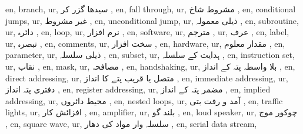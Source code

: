 en, branch,
ur,  سیدھا گزر کر  ,
en, fall through,
ur, مشروط شاخ  ,
en, conditional jumps,
ur, غیر مشروط  ,
en, unconditional jump,
ur, ذیلی معمولہ  ,
en, subroutine,
ur,  دائرہ  ,
en, loop,
ur, نرم افزار  ,
en, software,
ur,  مترجم  ,
ur, عرف  ,
en, label,
ur, تبصرہ  ,
en, comments,
ur,  سخت افزار  ,
en, hardware,
ur, مقدار معلوم  ,
en, parameter,
ur, ذیلی سلسلہ  ,
en, subset,
ur,  ہدایت کے سلسلہ  ,
en, instruction set,
ur, نقاب ,
en, mask,
ur,  مصافحہ  ,
en, handshaking,
ur,  بلا واسطہ پتہ کے انداز ,
en, direct addressing,
ur, متصل یا قریب پتے کا انداز ,
en, immediate addressing,
ur,  دفتری پتہ انداز ,
en, register addressing,
ur, مضمر پتہ کے انداز  ,
en, implied addressing,
ur,  محیط دائروں  ,
en, nested loops,
ur,  آمد و رفت بتی  ,
en, traffic lights,
ur,  افزائش کار ,
en, amplifier,
ur,  بلند گو  ,
en, loud speaker,
ur,  چوکور موج  ,
en, square wave,
ur, سلسلہ وار مواد کی دھار  ,
en, serial data stream,
